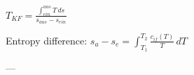 \( T_{KF} = \frac{\int_{ein}^{aus} T \, ds}{s_{aus} - s_{ein}} \)  

Entropy difference:  
\( s_a - s_e = \int_{T_1}^{T_2} \frac{c_{if}(T)}{T} \, dT \)  

---